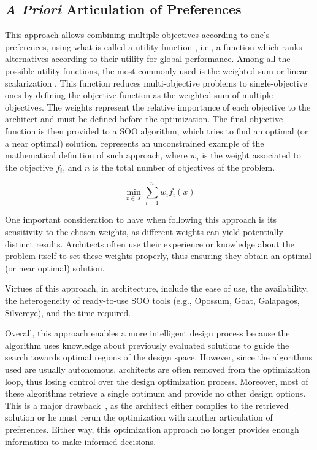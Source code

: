 \subsection{\textit{A Priori} Articulation of Preferences}
\label{subsec:preferencesarticulation}
This approach allows combining multiple objectives according to one’s preferences, using what is called a utility function \cite{Marler2004}, i.e., a function which ranks alternatives according to their utility for global performance. Among all the possible utility functions, the most commonly used is the weighted sum or linear scalarization \cite{Wortmann2017Opossum}. This function reduces multi-objective problems to single-objective ones by defining the objective function as the weighted sum of multiple objectives. The weights represent the relative importance of each objective to the architect and must be
defined before the optimization. The final objective function is then provided to a \ac{SOO} algorithm, which tries to find an optimal (or a near optimal) solution.  represents an unconstrained example of the mathematical definition of such approach, where $w_i$ is the weight associated to the objective $f_i$, and $n$ is the total number of objectives of the problem. 

\begin{equation} \label{eq:scalarization}
   	\min_{x \in X} \sum_{i=1}^n w_i f_i(x)
\end{equation}

One important consideration to have when following this approach is its sensitivity to the chosen weights, as different weights can yield potentially distinct results. Architects often use their experience or knowledge about the problem itself to set these weights properly, thus ensuring they obtain an optimal (or near optimal) solution.

Virtues of this approach, in architecture, include the ease of use, the availability, the heterogeneity of ready-to-use \ac{SOO} tools (e.g., Opossum, Goat, Galapagos, Silvereye), and the time required. %

Overall, this approach enables a more intelligent design process because the algorithm uses knowledge about previously evaluated solutions to guide the search towards optimal regions of the design space. However, since the algorithms used are usually autonomous, architects are often removed from the optimization loop, thus losing control over the design optimization process. Moreover, most of these algorithms retrieve a single optimum and provide no other design options. This is a major drawback~\cite{Cichocka2017SURVEY}, as the architect either complies to the retrieved solution or he must rerun the optimization with another articulation of preferences. Either way, this optimization approach no longer provides enough information to make informed decisions.

